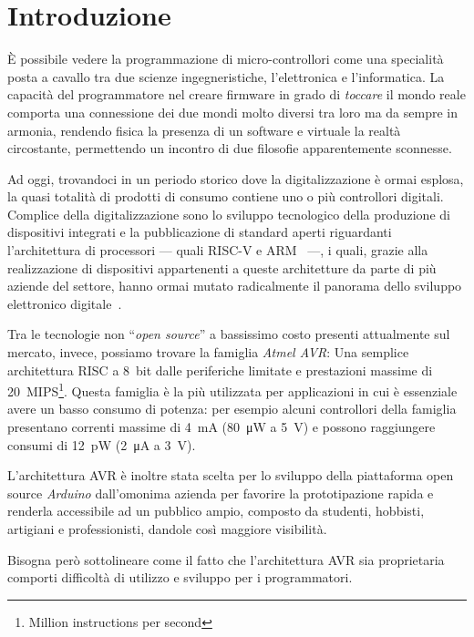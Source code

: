 \chapter{Introduzione}

È possibile vedere la programmazione di micro-controllori come una specialità posta a cavallo tra due scienze ingegneristiche, l'elettronica e l'informatica.
La capacità del programmatore nel creare firmware in grado di \textit{toccare} il mondo reale comporta una connessione dei due mondi molto diversi tra loro ma da sempre in armonia, rendendo fisica la presenza di un software e virtuale la realtà circostante, permettendo un incontro di due filosofie apparentemente sconnesse.

Ad oggi, trovandoci in un periodo storico dove la digitalizzazione è ormai esplosa, la quasi totalità di prodotti di consumo contiene uno o più controllori digitali.
Complice della digitalizzazione sono lo sviluppo tecnologico della produzione di dispositivi integrati e la pubblicazione di standard aperti riguardanti l'architettura di processori --- quali RISC-V e ARM~\cite{site:arm-licensing} ---, i quali, grazie alla realizzazione di dispositivi appartenenti a queste architetture da parte di più aziende del settore, hanno ormai mutato radicalmente il panorama dello sviluppo elettronico digitale~\cite{arm-intel-phone-market}\cite{site:arm-press-200b-chips}.

Tra le tecnologie non ``\textit{open source}'' a bassissimo costo presenti attualmente sul mercato, invece, possiamo trovare la famiglia \textit{Atmel AVR}: Una semplice architettura RISC a 8~bit dalle periferiche limitate e prestazioni massime di \SI{20}{MIPS}\footnote{Million instructions per second}.
Questa famiglia è la più utilizzata per applicazioni in cui è essenziale avere un basso consumo di potenza: per esempio alcuni controllori della famiglia presentano correnti massime di \SI{4}{\milli\ampere} (\SI{80}{\micro\watt} a \SI{5}{\volt}) e possono raggiungere consumi di \SI{12}{\pico\watt} (\SI{2}{\micro\ampere} a \SI{3}{\volt})\cite{avr:tiny4}.

L'architettura AVR è inoltre stata scelta per lo sviluppo della piattaforma open source \textit{Arduino} dall'omonima azienda per favorire la prototipazione rapida e renderla accessibile ad un pubblico ampio, composto da studenti, hobbisti, artigiani e professionisti\cite{site:arduino-about}, dandole così maggiore visibilità.

Bisogna però sottolineare come il fatto che l'architettura AVR sia proprietaria comporti difficoltà di utilizzo e sviluppo per i programmatori.

